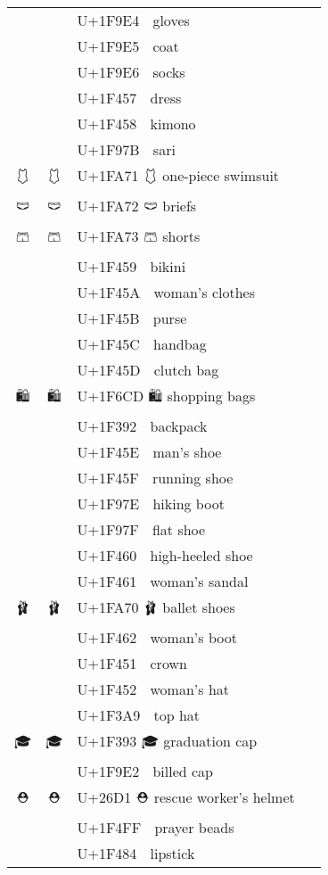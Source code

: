 \documentclass[a4paper,12pt]{ltjarticle}
\newcommand{\fontA}[1]{{\fontspec[RawFeature={mode=harf,+dist,+ccmp}]{Segoe UI Emoji} #1}}
\newcommand{\fontB}[1]{{\fontspec[RawFeature={mode=harf,+dist,+ccmp}]{Noto Color Emoji} #1}}
\begin{document}
\begin{longtable}[c]{ccp{0.8\linewidth}}
\fontA{🧤}&\fontB{🧤}&U+1F9E4 🧤 gloves\\
\fontA{🧥}&\fontB{🧥}&U+1F9E5 🧥 coat\\
\fontA{🧦}&\fontB{🧦}&U+1F9E6 🧦 socks\\
\fontA{👗}&\fontB{👗}&U+1F457 👗 dress\\
\fontA{👘}&\fontB{👘}&U+1F458 👘 kimono\\
\fontA{🥻}&\fontB{🥻}&U+1F97B 🥻 sari\\
\fontA{🩱}&\fontB{🩱}&U+1FA71 🩱 one-piece swimsuit\\
\fontA{🩲}&\fontB{🩲}&U+1FA72 🩲 briefs\\
\fontA{🩳}&\fontB{🩳}&U+1FA73 🩳 shorts\\
\fontA{👙}&\fontB{👙}&U+1F459 👙 bikini\\
\fontA{👚}&\fontB{👚}&U+1F45A 👚 woman’s clothes\\
\fontA{👛}&\fontB{👛}&U+1F45B 👛 purse\\
\fontA{👜}&\fontB{👜}&U+1F45C 👜 handbag\\
\fontA{👝}&\fontB{👝}&U+1F45D 👝 clutch bag\\
\fontA{🛍}&\fontB{🛍}&U+1F6CD 🛍 shopping bags\\
\fontA{🎒}&\fontB{🎒}&U+1F392 🎒 backpack\\
\fontA{👞}&\fontB{👞}&U+1F45E 👞 man’s shoe\\
\fontA{👟}&\fontB{👟}&U+1F45F 👟 running shoe\\
\fontA{🥾}&\fontB{🥾}&U+1F97E 🥾 hiking boot\\
\fontA{🥿}&\fontB{🥿}&U+1F97F 🥿 flat shoe\\
\fontA{👠}&\fontB{👠}&U+1F460 👠 high-heeled shoe\\
\fontA{👡}&\fontB{👡}&U+1F461 👡 woman’s sandal\\
\fontA{🩰}&\fontB{🩰}&U+1FA70 🩰 ballet shoes\\
\fontA{👢}&\fontB{👢}&U+1F462 👢 woman’s boot\\
\fontA{👑}&\fontB{👑}&U+1F451 👑 crown\\
\fontA{👒}&\fontB{👒}&U+1F452 👒 woman’s hat\\
\fontA{🎩}&\fontB{🎩}&U+1F3A9 🎩 top hat\\
\fontA{🎓}&\fontB{🎓}&U+1F393 🎓 graduation cap\\
\fontA{🧢}&\fontB{🧢}&U+1F9E2 🧢 billed cap\\
\fontA{⛑}&\fontB{⛑}&U+26D1 ⛑ rescue worker’s helmet\\
\fontA{📿}&\fontB{📿}&U+1F4FF 📿 prayer beads\\
\fontA{💄}&\fontB{💄}&U+1F484 💄 lipstick\\

\end{longtable}
\end{document}
